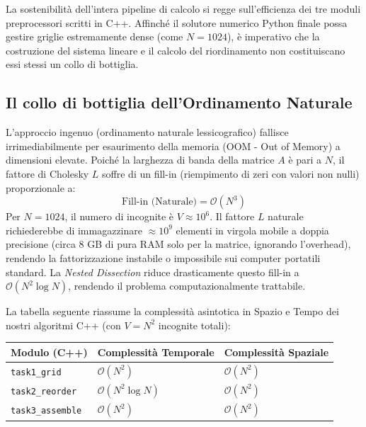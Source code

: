 \documentclass[a4paper,12pt]{article}
\begin{document}

La sostenibilità dell'intera pipeline di calcolo si regge sull'efficienza dei tre moduli preprocessori scritti in C++. Affinché il solutore numerico Python finale possa gestire griglie estremamente dense (come $N=1024$), è imperativo che la costruzione del sistema lineare e il calcolo del riordinamento non costituiscano essi stessi un collo di bottiglia.

\vspace{0.3cm}

\subsection{Il collo di bottiglia dell'Ordinamento Naturale}
L'approccio ingenuo (ordinamento naturale lessicografico) fallisce irrimediabilmente per esaurimento della memoria (OOM - Out of Memory) a dimensioni elevate. Poiché la larghezza di banda della matrice $A$ è pari a $N$, il fattore di Cholesky $L$ soffre di un fill-in (riempimento di zeri con valori non nulli) proporzionale a:
\begin{equation}
    \text{Fill-in (Naturale)} = \mathcal{O}(N^3)
\end{equation}
Per $N=1024$, il numero di incognite è $V \approx 10^6$. Il fattore $L$ naturale richiederebbe di immagazzinare $\approx 10^9$ elementi in virgola mobile a doppia precisione (circa 8 GB di pura RAM solo per la matrice, ignorando l'overhead), rendendo la fattorizzazione instabile o impossibile sui computer portatili standard. La \textit{Nested Dissection} riduce drasticamente questo fill-in a $\mathcal{O}(N^2 \log N)$, rendendo il problema computazionalmente trattabile.

\vspace{0.3cm}

La tabella seguente riassume la complessità asintotica in Spazio e Tempo dei nostri algoritmi C++ (con $V = N^2$ incognite totali):

\begin{table}[H]
\centering
\begin{tabular}{lll}
\toprule
\textbf{Modulo (C++)} & \textbf{Complessità Temporale} & \textbf{Complessità Spaziale} \\
\midrule
\texttt{task1\_grid} & $\mathcal{O}(N^2)$ & $\mathcal{O}(N^2)$ \\
\texttt{task2\_reorder} & $\mathcal{O}(N^2 \log N)$ & $\mathcal{O}(N^2)$ \\
\texttt{task3\_assemble} & $\mathcal{O}(N^2)$ & $\mathcal{O}(N^2)$ \\
\bottomrule
\end{tabular}
\end{table}
\end{document}
